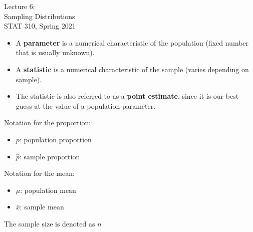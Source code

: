 \documentclass[11pt]{beamer}
\begin{document}
\begin{frame}
\large
Lecture 6:\\
Sampling Distributions\\
STAT 310, Spring 2021
\normalsize
\end{frame}

\begin{frame}
\begin{itemize}
\item A \textbf{parameter} is a numerical characteristic of the population (fixed number that is usually unknown).\\ 
\vspace{10pt}
\item A \textbf{statistic} is a numerical characteristic of the sample (varies depending on sample). \\
\vspace{10pt}
\item The statistic is also referred to as a \textbf{point estimate}, since it is our best guess at the value of a population parameter.  
\end{itemize}
\end{frame}

\begin{frame}
\end{frame}

\begin{frame}
\large
Notation for the proportion:
\begin{itemize}
\item $p$: population proportion
\item $\hat{p}$: sample proportion\\
\end{itemize}
\vspace{15pt}

Notation for the mean:
\begin{itemize}
\item $\mu$: population mean
\item $\bar{x}$: sample mean\\
\end{itemize}
\vspace{15pt}

The sample size is denoted as $n$
\end{frame}
\end{document}
